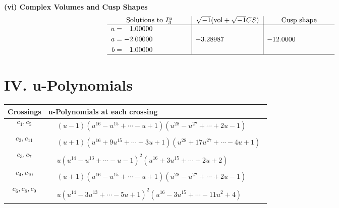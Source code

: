 \documentclass[1p]{elsarticle_modified}
\theoremstyle{definition}
\newcommand{\I}{\sqrt{-1}}
\begin{document}
\newpage\flushleft \textbf{(vi) Complex Volumes and Cusp Shapes}
$$\begin{array}{c|c|c}  
\text{Solutions to }I^u_{3}& \I (\text{vol} + \sqrt{-1}CS) & \text{Cusp shape}\\
 \hline 
\begin{aligned}
u &= \phantom{-}1.00000\phantom{ +0.000000I} \\
a &= -2.00000\phantom{ +0.000000I} \\
b &= \phantom{-}1.00000\phantom{ +0.000000I}\end{aligned}
 & -3.28987\phantom{ +0.000000I} & -12.0000\phantom{ +0.000000I}\\
 \hline 
 \end{array}$$\newpage
\newpage\renewcommand{\arraystretch}{1}
\centering \section*{ IV. u-Polynomials}
\begin{tabular}{m{50pt}|m{274pt}}
Crossings & \hspace{64pt}u-Polynomials at each crossing \\
\hline $$\begin{aligned}c_{1},c_{5}\end{aligned}$$&$\begin{aligned}
&(u-1)(u^{16}- u^{15}+\cdots- u+1)(u^{28}- u^{27}+\cdots+2 u-1)
\end{aligned}$\\
\hline $$\begin{aligned}c_{2},c_{11}\end{aligned}$$&$\begin{aligned}
&(u+1)(u^{16}+9 u^{15}+\cdots+3 u+1)(u^{28}+17 u^{27}+\cdots-4 u+1)
\end{aligned}$\\
\hline $$\begin{aligned}c_{3},c_{7}\end{aligned}$$&$\begin{aligned}
&u(u^{14}- u^{13}+\cdots- u-1)^{2}(u^{16}+3 u^{15}+\cdots+2 u+2)
\end{aligned}$\\
\hline $$\begin{aligned}c_{4},c_{10}\end{aligned}$$&$\begin{aligned}
&(u+1)(u^{16}- u^{15}+\cdots- u+1)(u^{28}- u^{27}+\cdots+2 u-1)
\end{aligned}$\\
\hline $$\begin{aligned}c_{6},c_{8},c_{9}\end{aligned}$$&$\begin{aligned}
&u(u^{14}-3 u^{13}+\cdots-5 u+1)^{2}(u^{16}-3 u^{15}+\cdots-11 u^2+4)
\end{aligned}$\\
\hline
\end{tabular}\newpage\renewcommand{\arraystretch}{1}
\end{document}
